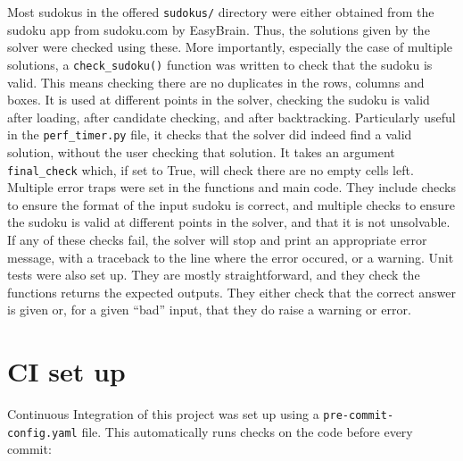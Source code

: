 \documentclass[12pt]{report} %
\begin{document}
Most sudokus in the offered \texttt{sudokus/} directory were either obtained from the sudoku app from sudoku.com\cite{sudoku_com} by EasyBrain. Thus, the solutions given by the solver were checked using these. More importantly, especially the case of multiple solutions, a \texttt{check\_sudoku()} function was written to check that the sudoku is valid. This means checking there are no duplicates in the rows, columns and boxes. It is used at different points in the solver, checking the sudoku is valid after loading, after candidate checking, and after backtracking. Particularly useful in the \texttt{perf\_timer.py} file, it checks that the solver did indeed find a valid solution, without the user checking that solution. It takes an argument \texttt{final\_check} which, if set to True, will check there are no empty cells left.
Multiple error traps were set in the functions and main code. They include checks to ensure the format of the input sudoku is correct, and multiple checks to ensure the sudoku is valid at different points in the solver, and that it is not unsolvable. If any of these checks fail, the solver will stop and print an appropriate error message, with a traceback to the line where the error occured, or a warning.
Unit tests were also set up. They are mostly straightforward, and they check the functions returns the expected outputs. They either check that the correct answer is given or, for a given ``bad'' input, that they do raise a warning or error.

\section{CI set up}

Continuous Integration of this project was set up using a \texttt{pre-commit-config.yaml} file. This automatically runs checks on the code before every commit:
\end{document}
